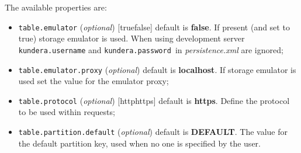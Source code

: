 \noindent The available properties are:
\begin{itemize}
\item \texttt{table.emulator} (\textit{optional}) [true\textbar false] default is \textbf{false}. If present (and set to true) storage emulator is used. When using development server \texttt{kundera.username} and \texttt{kundera.password }in \textit{persistence.xml} are ignored;
\item \texttt{table.emulator.proxy} (\textit{optional}) default is \textbf{localhost}. If storage emulator is used set the value for the emulator proxy;
\item \texttt{table.protocol} (\textit{optional}) [http\textbar https] default is \textbf{https}. Define the protocol to be used within requests;
\item \texttt{table.partition.default} (\textit{optional}) default is \textbf{DEFAULT}.
The value for the default partition key, used when no one is specified by the user.
\end{itemize}